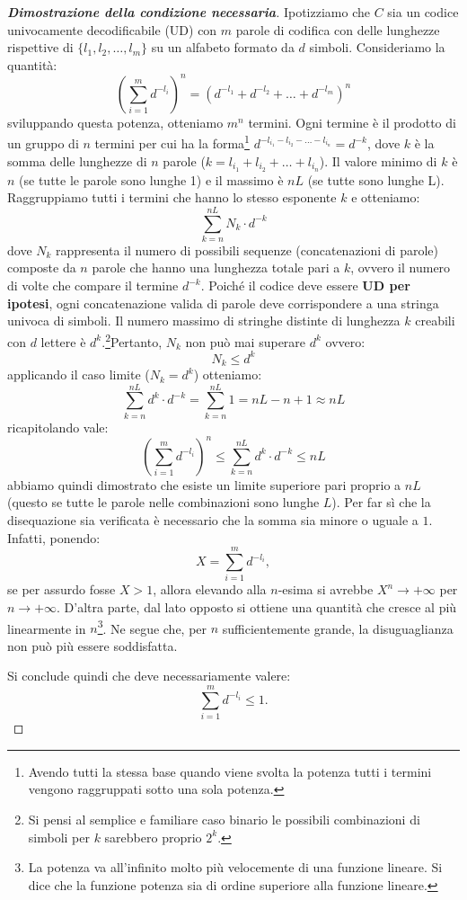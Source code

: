 \documentclass{article}
\theoremstyle{definition}
\numberwithin{equation}{section}
\begin{document}
\begin{proof}[\textbf{Dimostrazione della condizione necessaria}]
    Ipotizziamo che $C$ sia un codice univocamente decodificabile (UD) con $m$ parole di codifica con delle lunghezze rispettive di $\{l_1,l_2,\ldots,l_m\}$ su un alfabeto formato da $d$ simboli. Consideriamo la quantità:
    \[
        \left(\sum_{i=1}^m d^{-l_i}\right)^n = \left(d^{-l_1}+d^{-l_2}+\ldots+d^{-l_m} \right)^n
    \]
    sviluppando questa potenza, otteniamo $m^n$ termini. Ogni termine è il prodotto di un gruppo di $n$ termini per cui ha la forma\footnote{Avendo tutti la stessa base quando viene svolta la potenza tutti i termini vengono raggruppati sotto una sola potenza.} $d^{-l_{i_1}-l_{i_2}-\ldots-l_{i_n}}=d^{-k}$, dove $k$ è la somma delle lunghezze di $n$ parole ($k=l_{i_1}+l_{i_2}+\ldots+l_{i_n}$). Il valore minimo di $k$ è $n$ (se tutte le parole sono lunghe 1) e il massimo è $nL$ (se tutte sono lunghe L). Raggruppiamo tutti i termini che hanno lo stesso esponente $k$ e otteniamo:
    \[
        \sum_{k=n}^{nL} N_k \cdot d^{-k}
    \]
    dove $N_k$ rappresenta il numero di possibili sequenze (concatenazioni di parole) composte da $n$ parole che hanno una lunghezza totale pari a $k$, ovvero il numero di volte che compare il termine $d^{-k}$. Poiché il codice deve essere \textbf{UD per ipotesi}, ogni concatenazione valida di parole deve corrispondere a una stringa univoca di simboli. Il numero massimo di stringhe distinte di lunghezza $k$ creabili con $d$ lettere è $d^k$.\footnote{Si pensi al semplice e familiare caso binario le possibili combinazioni di simboli per $k$ sarebbero proprio $2^k$.}Pertanto, $N_k$ non può mai superare $d^k$ ovvero:
    \[
        N_k\leq d^k
    \]
    applicando il caso limite ($N_k=d^k$) otteniamo:
    \[
        \sum_{k=n}^{nL} d^k \cdot d^{-k} = \sum_{k=n}^{nL} 1 = nL-n+1 \approx nL
    \]
    ricapitolando vale:
    \[
        \left(\sum_{i=1}^m d^{-l_i}\right)^n \leq \sum_{k=n}^{nL} d^k \cdot d^{-k} \leq nL
    \]
    abbiamo quindi dimostrato che esiste un limite superiore pari proprio a $nL$ (questo se tutte le parole nelle combinazioni sono lunghe $L$). Per far sì che la disequazione sia verificata è necessario che la somma sia minore o uguale a $1$. Infatti, ponendo:
    \[
        X = \sum_{i=1}^m d^{-l_i},
    \]
    se per assurdo fosse $X > 1$, allora elevando alla $n$-esima si avrebbe $X^n \to +\infty$ per $n \to +\infty$. D'altra parte, dal lato opposto si ottiene una quantità che cresce al più linearmente in $n$\footnote{La potenza va all'infinito molto più velocemente di una funzione lineare. Si dice che la funzione potenza sia di ordine superiore alla funzione lineare.}. Ne segue che, per $n$ sufficientemente grande, la disuguaglianza non può più essere soddisfatta.

    Si conclude quindi che deve necessariamente valere:
    \[
        \sum_{i=1}^m d^{-l_i} \leq 1.
    \]
\end{proof}
\end{document}
